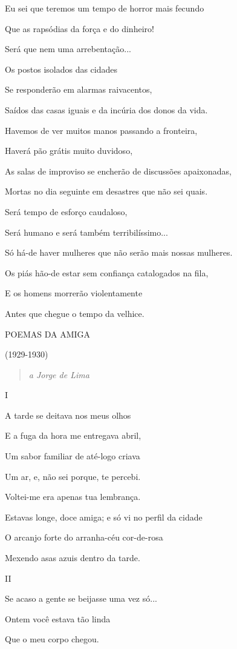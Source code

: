 Eu sei que teremos um tempo de horror mais fecundo

Que as rapsódias da força e do dinheiro!

Será que nem uma arrebentação...

Os postos isolados das cidades

Se responderão em alarmas raivacentos,

Saídos das casas iguais e da incúria dos donos da vida.

Havemos de ver muitos manos passando a fronteira,

Haverá pão grátis muito duvidoso,

As salas de improviso se encherão de discussões apaixonadas,

Mortas no dia seguinte em desastres que não sei quais.

Será tempo de esforço caudaloso,

Será humano e será também terribilíssimo...

Só há-de haver mulheres que não serão mais nossas mulheres.

Os piás hão-de estar sem confiança catalogados na fila,

E os homens morrerão violentamente

Antes que chegue o tempo da velhice.

\textsc{POEMAS DA AMIGA}

(1929-1930)

\begin{quote}
\emph{a Jorge de Lima}
\end{quote}

I

A tarde se deitava nos meus olhos

E a fuga da hora me entregava abril,

Um sabor familiar de até-logo criava

Um ar, e, não sei porque, te percebi.

Voltei-me era apenas tua lembrança.

Estavas longe, doce amiga; e só vi no perfil da cidade

O arcanjo forte do arranha-céu cor-de-rosa

Mexendo asas azuis dentro da tarde.

II

Se acaso a gente se beijasse uma vez só...

Ontem você estava tão linda

Que o meu corpo chegou.

